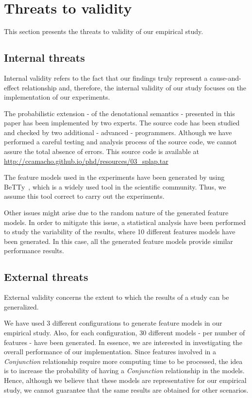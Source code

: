 \section{Threats to validity}
\label{section_threats}

This section presents the threats to validity of our empirical study.

\subsection{Internal threats}

Internal validity refers to the fact that our findings truly represent a cause-and-effect relationship and, therefore, the internal validity of our study focuses on the implementation of our experiments.

The probabilistic extension - of the denotational semantics - presented in this paper has been implemented by two experts. The source code has been studied and checked by two additional - advanced - programmers. Although we have performed a careful testing and analysis process of the source code, we cannot assure the total absence of errors. This source code is available at \url{http://ccamacho.github.io/phd/resources/03_splap.tar}

The feature models used in the experiments have been generated by using BeTTy~\cite{sg12}, which is a widely used tool in the scientific community. Thus, we assume this tool correct to carry out the experiments.

Other issues might arise due to the random nature of the generated feature models. In order to mitigate this issue, a statistical analysis have been performed to study the variability of the results, where 10 different features models have been generated. In this case, all the generated feature models provide similar performance results.

\subsection{External threats}

External validity concerns the extent to which the results of a study can be generalized.

We have used 3 different configurations to generate feature models in our empirical study. Also, for each configuration, 30 different models - per number of features - have been generated. In essence, we are interested in investigating the overall performance of our implementation. Since features involved in a \textit{Conjunction} relationship require more computing time to be processed, the idea is to increase the probability of having a \textit{Conjunction} relationship in the models. Hence, although we believe that these models are representative for our empirical study, we cannot guarantee that the same results are obtained for other scenarios.



